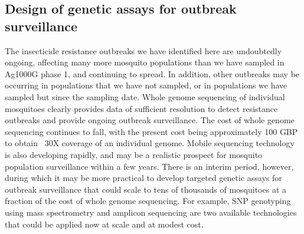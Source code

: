 \documentclass[a4paper,11pt,abstracton]{scrartcl}
\begin{document}
\subsection*{Design of genetic assays for outbreak surveillance}


%
The insecticide resistance outbreaks we have identified here are undoubtedly ongoing, affecting many more mosquito populations than we have sampled in Ag1000G phase 1, and continuing to spread.
%
In addition, other outbreaks may be occurring in populations that we have not sampled, or in populations we have sampled but since the sampling date.
%
Whole genome sequencing of individual mosquitoes clearly provides data of sufficient resolution to detect resistance outbreaks and provide ongoing outbreak surveillance.
%
The cost of whole genome sequencing continues to fall, with the present cost being approximately 100 GBP to obtain ~30X coverage of an individual genome.
%
Mobile sequencing technology is also developing rapidly, and may be a realistic prospect for mosquito population surveillance within a few years.
%
There is an interim period, however, during which it may be more practical to develop targeted genetic assays for outbreak surveillance that could scale to tens of thousands of mosquitoes at a fraction of the cost of whole genome sequencing.
%
For example, SNP genotyping using mass spectrometry and amplicon sequencing are two available technologies that could be applied now at scale and at modest cost. 
\end{document}
